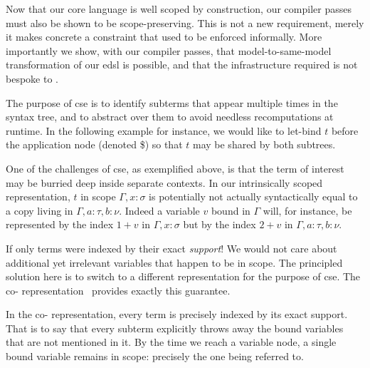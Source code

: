 

Now that our core language is well scoped by construction, our compiler passes
must also be shown to be scope-preserving.
%
This is not a new requirement, merely it makes concrete a constraint that
used to be enforced informally.
More importantly we show, with our compiler passes, that model-to-same-model transformation of our \ac{edsl} is possible, and that the infrastructure required is not bespoke to \Velo{}.

The purpose of \ac{cse} is to identify subterms that appear multiple times in the syntax tree, and to abstract over them to avoid needless recomputations at runtime.
%
In the following example for instance, we would like to let-bind $t$ before
the application node (denoted \$) so that $t$ may be shared by both subtrees.

\begin{center}
  \cseexamplegraph{}
\end{center}

One of the challenges of \ac{cse}, as exemplified above, is that the term of interest
may be burried deep inside separate contexts.
%
In our intrinsically scoped representation, $t$ in scope $\Gamma, x : \sigma$ is potentially not actually syntactically equal to a copy living in $\Gamma, a : \tau, b : \nu$.
%
Indeed a variable $v$ bound in $\Gamma$ will, for instance, be represented by
the \DeBruijn{} index $1+v$ in $\Gamma, x : \sigma$
but by the index $2+v$ in $\Gamma, a :  \tau, b : \nu$.

If only terms were indexed by their exact \emph{support}!
We would not care about additional yet irrelevant variables that happen to be in scope.
%
The principled solution here is to switch to a different representation for
the purpose of \ac{cse}.
The co-\DeBruijn{} representation~\cite{DBLP:journals/corr/abs-1807-04085} provides exactly this guarantee.


In the co-\DeBruijn{} representation, every term is precisely indexed by its
exact support.
%
That is to say that every subterm explicitly throws away the bound variables
that are not mentioned in it.
%
By the time we reach a variable node, a single bound variable remains in scope:
precisely the one being referred to.


